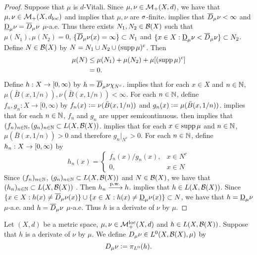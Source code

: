 \documentclass{book}
\begin{document}
	\begin{proof}
		Suppose that $\mu$ is $d$-Vitali. 
		Since $\mu, \nu \in \mathcal{M}_+(X,d)$, we have that $\mu, \nu \in \mathcal{M}_+(X,d_{\text{loc}})$ and  implies that $\mu, \nu$ are $\sigma$-finite.  implies that $\overline{D}_{\mu}\nu < \infty$ and $\underbar{D}_{\mu}\nu = \overline{D}_{\mu}\nu$ $\mu$-a.e. Thus there exists $N_1,N_2 \in \mathcal{B}(X)$ such that $\mu(N_1),\mu(N_2) = 0$, $\{\overline{D}_{\mu}\nu(x) = \infty\} \subset N_1$ and $\{x \in X: \underbar{D}_{\mu}\nu < \overline{D}_{\mu}\nu\} \subset N_2$. Define $N \in \mathcal{B}(X)$ by $N = N_1 \cup N_2 \cup( \operatorname{supp} \mu)^c$. Then 
		\begin{align*}
			\mu(N)
			& \leq \mu(N_1) + \mu(N_2) + \mu[(\operatorname{supp} \mu)^c] \\
			& = 0.
		\end{align*}
		Define $h:X \rightarrow [0,\infty)$ by $h = \overline{D}_{\mu} \nu \chi_{N^c}$.  implies that for each $x \in X$ and $n \in \mathbb{N}$, $\mu(\bar{B}(x, 1/n)), \nu(\bar{B}(x, 1/n)) < \infty$.   
		For each $n \in \mathbb{N}$, define $f_n, g_n: X \rightarrow [0, \infty)$ by $f_n(x) \vcentcolon= \nu(\bar{B}(x, 1/n))$ and $g_n(x) \vcentcolon= \mu(\bar{B}(x, 1/n))$.  implies that for each $n \in \mathbb{N}$, $f_n$ and $g_n$ are upper semicontinuous.  then implies that $(f_n)_{n \in \mathbb{N}}, (g_n)_{n \in \mathbb{N}} \subset L(X, \mathcal{B}(X))$.  implies that for each $x \in \operatorname{supp} \mu$ and $n \in \mathbb{N}$, $\mu(\bar{B}(x, 1/n)) > 0$ and therefore $g_n|_{N^c} > 0$.
		For each $n \in \mathbb{N}$, define $h_n :X \rightarrow [0,\infty)$ by  
		\[
		h_n(x) = 
		\begin{cases}
			f_n(x)/g_n(x), & x \in N^c \\
			0, & x \in N
		\end{cases}
		\]
		Since $(f_n)_{n \in \mathbb{N}}$, $(g_n)_{n \in \mathbb{N}} \subset L(X, \mathcal{B}(X))$ and $N \in \mathcal{B}(X)$, we have that $(h_n)_{n \in \mathbb{N}} \subset L(X, \mathcal{B}(X))$ . Then $h_n \xrightarrow{\text{p.w.}} h$.  implies that $h \in L(X, \mathcal{B}(X))$. Since $\{x \in X: h(x) \neq \overline{D}_{\mu}\nu(x)\} \cup \{x \in X: h(x) \neq \underbar{D}_{\mu}\nu(x)\} \subset N$, we have that $h = \underbar{D}_{\mu}\nu$ $\mu$-a.e. and $h = \overline{D}_{\mu}\nu$ $\mu$-a.e. Thus $h$ is a derivate of $\nu$ by $\mu$.
	\end{proof}

	\begin{defn} 
		Let $(X, d)$ be a metric space, $\mu, \nu \in \mathcal{M}_+^{\text{loc}}(X, d)$ and $h \in L(X, \mathcal{B}(X))$. Suppose that $h$ is a derivate of $\nu$ by $\mu$. We define $D_{\mu} \nu \in L^0(X, \mathcal{B}(X), \mu)$ by $$D_{\mu} \nu \vcentcolon= \pi_{L^0}(h).$$ 
	\end{defn}
\end{document}
